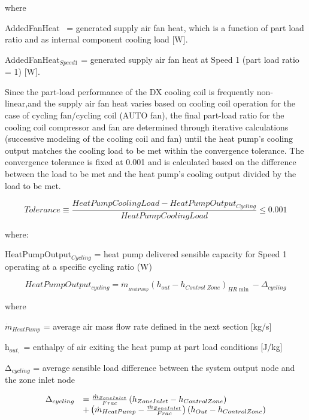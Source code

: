 where

AddedFanHeat~ = generated supply air fan heat, which is a function of part load ratio and as internal component cooling load {[}W{]}.

AddedFanHeat\(_{Speed1}\) = generated supply air fan heat at Speed 1 (part load ratio = 1) {[}W{]}.

Since the part-load performance of the DX cooling coil is frequently non-linear,and the supply air fan heat varies based on cooling coil operation for the case of cycling fan/cycling coil (AUTO fan), the final part-load ratio for the cooling coil compressor and fan are determined through iterative calculations (successive modeling of the cooling coil and fan) until the heat pump's cooling output matches the cooling load to be met within the convergence tolerance. The convergence tolerance is fixed at 0.001 and is calculated based on the difference between the load to be met and the heat pump's cooling output divided by the load to be met.

\begin{equation}
  Tolerance \equiv \frac{HeatPumpCoolingLoad - HeatPumpOutput_{Cycling}}{HeatPumpCoolingLoad} \leq 0.001
\end{equation}

where:

HeatPumpOutput\(_{Cycling}\) = heat pump delivered sensible capacity for Speed 1 operating at a specific cycling ratio (W)

\begin{equation}
HeatPumpOutpu{t_{cycling}} = {\dot m_{_{HeatPump}}}{\left( {{h_{out}} - {h_{Control\;Zone}}} \right)_{HR\min }} - {\Delta_{cycling}}
\end{equation}

where

\({\dot m_{HeatPump}}\) = average air mass flow rate defined in the next section {[}kg/s{]}

h\(_{out,}\) = enthalpy of air exiting the heat pump at part load conditions {[}J/kg{]}

Δ\(_{cycling}\) = average sensible load difference between the system output node and the zone inlet node

\begin{equation}
  \begin{array}{rl}
    \Delta_{cycling} &= \frac{\dot{m}_{ZoneInlet}}{Frac} \left(h_{ZoneInlet}-h_{ControlZone}\right) \\
                           &+ \left(\dot{m}_{HeatPump} - \frac{\dot{m}_{ZoneInlet}}{Frac}\right) \left(h_{Out} - h_{ControlZone}\right)
  \end{array}
\end{equation}

